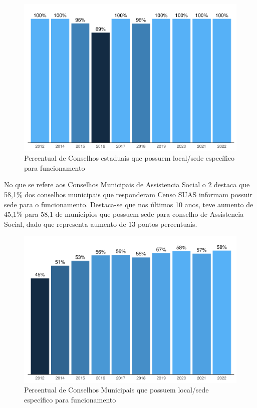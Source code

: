 \documentclass[
  brazilian]{report}
\begin{document}
\begin{figure}
\includegraphics{Censo-SUAS-2022_files/figure-latex/ceas_sede-1} \caption[Percentual de Conselhos estaduais que possuem local/sede específico para funcionamento]{Percentual de Conselhos estaduais que possuem local/sede específico para funcionamento}\label{fig:ceas_sede}
\end{figure}

No que se refere aos Conselhos Municipais de Assistencia Social o
\cref{fig:cmas_sede} destaca que 58,1\% dos conselhos municipais que
responderam Censo SUAS informam possuir sede para o funcionamento.
Destaca-se que nos últimos 10 anos, teve aumento de 45,1\% para 58,1 de
municípios que possuem sede para conselho de Assistencia Social, dado
que representa aumento de 13 pontos percentuais.

\begin{figure}
\includegraphics{Censo-SUAS-2022_files/figure-latex/cmas_sede-1} \caption[Percentual de Conselhos Municipais que possuem local/sede específico para funcionamento]{Percentual de Conselhos Municipais que possuem local/sede específico para funcionamento}\label{fig:cmas_sede}
\end{figure}
\end{document}
